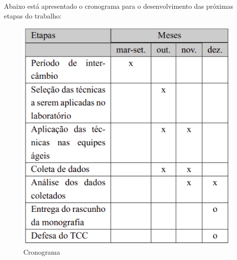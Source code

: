 \documentclass[
    12pt,       %
    openright,      %
    twoside,      %
    a4paper,      %
    english,      %
    french,       %
    spanish,      %
    brazil,       %
    ]{abntex2}
\begin{document}
Abaixo está apresentado o cronograma para o desenvolvimento das próximas etapas do trabalho:

\begin{figure}[H]
    \centering
    \includegraphics[scale=0.6]{src/tex/img/cronograma.png}
    \caption{Cronograma}
    \label{fig:cronograma}
\end{figure}


  \postextual


  
  

\end{document}

